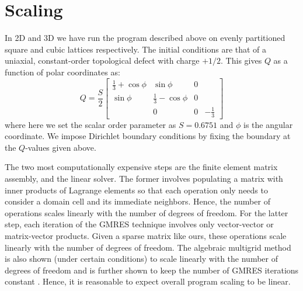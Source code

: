 \documentclass[reqno]{article}
\begin{document}
\section{Scaling}
In 2D and 3D we have run the program described above on evenly partitioned
square and cubic lattices respectively.
The initial conditions are that of a uniaxial, constant-order topological defect
with charge $+1/2$.
This gives $Q$ as a function of polar coordinates as:
\begin{equation}
  Q
  =
  \frac{S}{2}
  \begin{bmatrix}
    \frac13 + \cos\phi &\sin\phi &0 \\
    \sin\phi &\frac13 - \cos\phi &0 \\
    &0 &0 &-\frac13
  \end{bmatrix}
\end{equation}
where here we set the scalar order parameter as $S = 0.6751$ and $\phi$ is the angular coordinate.
We impose Dirichlet boundary conditions by fixing the boundary at the $Q$-values
given above.

The two most computationally expensive steps are the finite
element matrix assembly, and the linear solver.
The former involves populating a matrix with inner products of
Lagrange elements so that each operation only needs to consider a domain cell and its
immediate neighbors.
Hence, the number of operations scales linearly with the number of degrees of
freedom.
For the latter step, each iteration of the GMRES technique involves only
vector-vector or matrix-vector products.
Given a sparse matrix like ours, these operations scale linearly with the number
of degrees of freedom.
The algebraic multigrid method is also shown (under certain conditions) to scale linearly with the number
of degrees of freedom and is further shown to keep the number
of GMRES iterations constant \cite{doi:10.1137/1.9781611971057.ch4}.
Hence, it is reasonable to expect overall program scaling to be linear.
\end{document}
